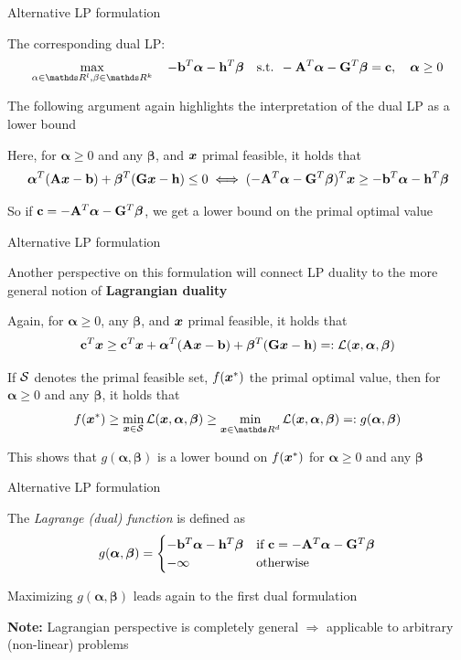\documentclass[11pt,compress,t,notes=noshow, xcolor=table]{beamer}
\begin{document}
\begin{framei}{Alternative LP formulation}
\item The corresponding dual LP:
$$\max_{\alpha \in \R^l, \beta \in \R^k} \quad -\bv^T \bm{\alpha} - \mathbf{h}^T \bm{\beta} \quad \text{s.t. } -\Amat^T \bm{\alpha} - \mathbf{G}^T \bm{\beta} = \mathbf{c}, \quad \bm{\alpha} \ge 0$$
\item The following argument again highlights the interpretation of the dual LP as a lower bound
\item Here, for $\bm{\alpha} \ge 0$ and any $\bm{\beta}$, and $\xv$ primal feasible, it holds that
$$\bm{\alpha}^T (\Amat \xv - \bv) + \bm{\beta}^T (\mathbf{G} \xv - \mathbf{h}) \le 0 \iff (-\Amat^T \bm{\alpha} - \mathbf{G}^T \bm{\beta})^T \xv \ge -\bv^T \bm{\alpha} - \mathbf{h}^T \bm{\beta}$$
\item So if $\mathbf{c} = -\Amat^T \bm{\alpha} - \mathbf{G}^T \bm{\beta}$, we get a lower bound on the primal optimal value
\end{framei}


\begin{framei}{Alternative LP formulation}
\item Another perspective on this formulation will connect LP duality to the more general notion of \textbf{Lagrangian duality}
\item Again, for $\bm{\alpha} \ge 0$, any $\bm{\beta}$, and $\xv$ primal feasible, it holds that
$$\mathbf{c}^T \xv \ge \mathbf{c}^T \xv + \bm{\alpha}^T (\Amat \xv - \bv) + \bm{\beta}^T (\mathbf{G} \xv - \mathbf{h}) =: \mathcal{L}(\xv, \bm{\alpha}, \bm{\beta})$$
\item If $\S$ denotes the primal feasible set, $f(\xvs)$ the primal optimal value, then for $\bm{\alpha} \ge 0$ and any $\bm{\beta}$, it holds that
$$f(\xvs) \ge \min_{\xv \in \S} \mathcal{L}(\xv, \bm{\alpha}, \bm{\beta}) \ge \min_{\xv \in \R^d} \mathcal{L}(\xv, \bm{\alpha}, \bm{\beta}) =: g(\bm{\alpha}, \bm{\beta})$$
\item This shows that $g(\bm{\alpha}, \bm{\beta})$ is a lower bound on $f(\xvs)$ for $\bm{\alpha} \ge 0$ and any $\bm{\beta}$
\end{framei}


\begin{framei}{Alternative LP formulation}
\item The \emph{Lagrange (dual) function} is defined as
$$g(\bm{\alpha}, \bm{\beta}) =
\begin{cases}
-\bv^T \bm{\alpha} - \mathbf{h}^T \bm{\beta} & \text{if $\mathbf{c} = -\Amat^T \bm{\alpha} - \mathbf{G}^T \bm{\beta}$} \\
-\infty & \text{otherwise}
\end{cases}$$
\item Maximizing $g(\bm{\alpha}, \bm{\beta})$ leads again to the first dual formulation
\item[] \textbf{Note:} Lagrangian perspective is completely general $\Rightarrow$ applicable to arbitrary (non-linear) problems
\end{framei}
\end{document}
